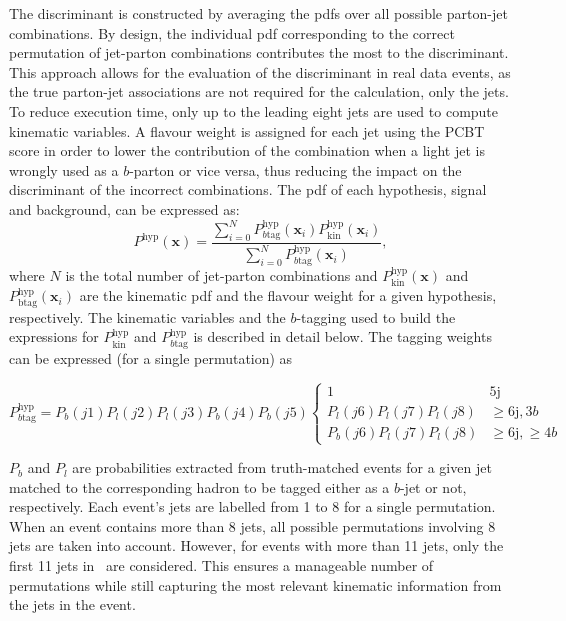 The discriminant is constructed by averaging the pdfs over all possible parton-jet combinations. By design, the individual pdf corresponding to the correct permutation of jet-parton combinations contributes the most to the discriminant. This approach allows for the evaluation of the discriminant in real data events, as the true parton-jet associations are not required for the calculation, only the jets. To reduce execution time, only up to the leading eight jets are used to compute kinematic variables. A flavour weight is assigned for each jet using the PCBT score in order to lower the contribution of the combination when a light jet is wrongly used as a $b$-parton or vice versa, thus reducing the impact on the discriminant of the incorrect combinations. The pdf of each hypothesis, signal and background, can be expressed as:
\begin{equation}
    P^{\text{hyp}}(\textbf{x})=\frac{\sum_{i=0}^N P^{\text{hyp}}_{b\text{tag}}(\textbf{x}_i)P^{\text{hyp}}_{\text{kin}}(\textbf{x}_i)}{\sum_{i=0}^N P^{\text{hyp}}_{b\text{tag}}(\textbf{x}_i)},
    \label{eq3:PDF}
\end{equation}
where $N$ is the total number of jet-parton combinations and $P^{\text{hyp}}_{\text{kin}}(\textbf{x})$ and $P^{\text{hyp}}_{\text{btag}}(\textbf{x}_i)$ are the kinematic pdf and the flavour weight for a given hypothesis, respectively. The kinematic variables and the $b$-tagging used to build the expressions for $P^{\text{hyp}}_{\text{kin}}$ and $P^{\text{hyp}}_{b\text{tag}}$ is described in detail below. The tagging weights can be expressed (for a single permutation) as

\begin{equation}
    P^{\text{hyp}}_{b\text{tag}}=P_b(j1)P_l(j2)P_l(j3)P_b(j4)P_b(j5)\begin{cases}1&5\text{j}\\P_l(j6)P_l(j7)P_l(j8)& \geq6\text{j},3b\\P_b(j6)P_l(j7)P_l(j8)&\geq6\text{j},\geq4b\end{cases}
\end{equation}

$P_b$ and $P_l$ are probabilities extracted from truth-matched events for a given jet matched to the corresponding hadron to be tagged either as a $b$-jet or not, respectively. Each event's jets are labelled from 1 to 8 for a single permutation. When an event contains more than 8 jets, all possible permutations involving 8 jets are taken into account. However, for events with more than 11 jets, only the first 11 jets in \pT\ are considered. This ensures a manageable number of permutations while still capturing the most relevant kinematic information from the jets in the event.\\

